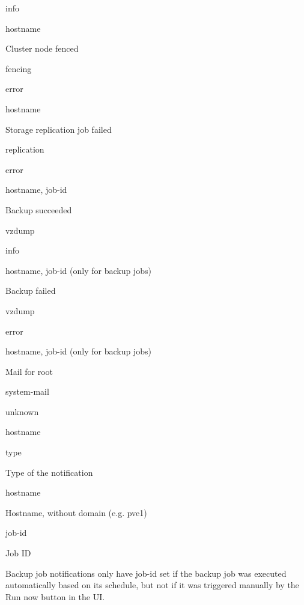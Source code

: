 info

hostname

Cluster node fenced

fencing

error

hostname

Storage replication job failed

replication

error

hostname, job-id

Backup succeeded

vzdump

info

hostname, job-id (only for backup jobs)

Backup failed

vzdump

error

hostname, job-id (only for backup jobs)

Mail for root

system-mail

unknown

hostname

type

Type of the notification

hostname

Hostname, without domain (e.g. pve1)

job-id

Job ID

Backup job notifications only have job-id set if the backup job was executed automatically based on its schedule, but not if it was triggered manually by the Run now button in the UI.

\begin{table}[htbp]

\centering

\begin{tabular}

\end{tabular}

\end{table}

\begin{table}[htbp]

\centering

\begin{tabular}

\end{tabular}

\end{table}



